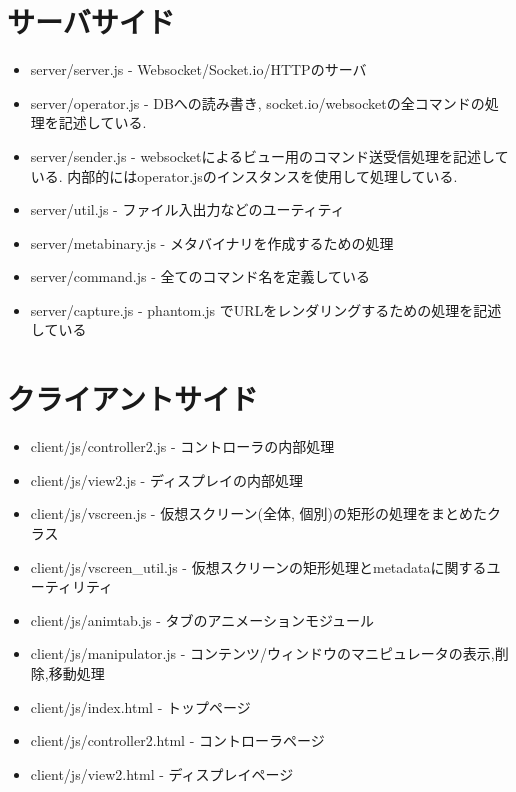 \documentclass[a4paper,10pt,oneside]{jsbook}
\begin{document}
\section{サーバサイド}
\begin{itemize}
\item server/server.js  - Websocket/Socket.io/HTTPのサーバ
\item server/operator.js - DBへの読み書き, socket.io/websocketの全コマンドの処理を記述している.
\item server/sender.js - websocketによるビュー用のコマンド送受信処理を記述している. 内部的にはoperator.jsのインスタンスを使用して処理している.
\item server/util.js - ファイル入出力などのユーティティ
\item server/metabinary.js - メタバイナリを作成するための処理
\item server/command.js - 全てのコマンド名を定義している
\item server/capture.js - phantom.js でURLをレンダリングするための処理を記述している
\end{itemize}

\section{クライアントサイド}
\begin{itemize}
\item client/js/controller2.js - コントローラの内部処理
\item client/js/view2.js - ディスプレイの内部処理
\item client/js/vscreen.js - 仮想スクリーン(全体, 個別)の矩形の処理をまとめたクラス
\item client/js/vscreen\_util.js - 仮想スクリーンの矩形処理とmetadataに関するユーティリティ
\item client/js/animtab.js - タブのアニメーションモジュール
\item client/js/manipulator.js - コンテンツ/ウィンドウのマニピュレータの表示,削除,移動処理
\item client/js/index.html - トップページ
\item client/js/controller2.html - コントローラページ
\item client/js/view2.html - ディスプレイページ
\end{itemize}
\end{document}
